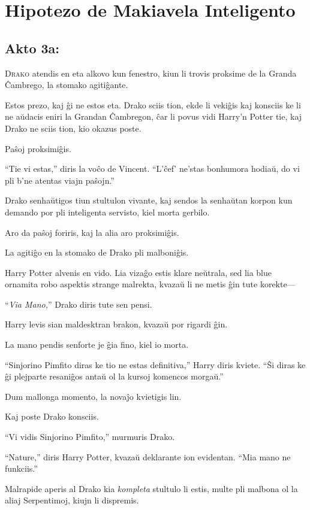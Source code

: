 \chapter{Hipotezo de Makiavela Inteligento}

\section{Akto 3a:}

\lettrine{D}{rako} atendis en eta alkovo kun fenestro, kiun li trovis proksime de la Granda Ĉambrego, la stomako agitiĝante.

Estos prezo, kaj ĝi ne estos eta. Drako sciis tion, ekde li vekiĝis kaj konsciis ke li ne aŭdacis eniri la Grandan Ĉambregon, ĉar li povus vidi Harry'n Potter tie, kaj Drako ne sciis tion, kio okazus poste.

Paŝoj proksimiĝis.

``Tie vi estas,'' diris la voĉo de Vincent. ``L'ĉef' ne'stas bonhumora hodiaŭ, do vi pli b'ne atentas viajn paŝojn.''

Drako senhaŭtigos tiun stultulon vivante, kaj sendos la senhaŭtan korpon kun demando por pli inteligenta servisto, kiel morta gerbilo.

Aro da paŝoj foriris, kaj la alia aro proksimiĝis.

La agitiĝo en la stomako de Drako pli malboniĝis.

Harry Potter alvenis en vido. Lia vizaĝo estis klare neŭtrala, sed lia blue ornamita robo aspektis strange malrekta, kvazaŭ li ne metis ĝin tute korekte—

``\emph{Via Mano,}'' Drako diris tute sen pensi.

Harry levis sian maldesktran brakon, kvazaŭ por rigardi ĝin.

La mano pendis senforte je ĝia fino, kiel io morta.

``Sinjorino Pimfito diras ke tio ne estas definitiva,'' Harry diris
kviete. ``Ŝi diras ke ĝi plejparte resaniĝos antaŭ ol la kursoj
komencos morgaŭ.''

Dum mallonga momento, la novaĵo kvietigis lin.

Kaj poste Drako konsciis.

``Vi vidis Sinjorino Pimfito,'' murmuris Drako.

``Nature,'' diris Harry Potter, kvazaŭ deklarante ion evidentan. ``Mia mano ne funkciis.''

Malrapide aperis al Drako kia \emph{kompleta} stultulo li estis, multe pli malbona ol la aliaj Serpentimoj, kiujn li dispremis.


